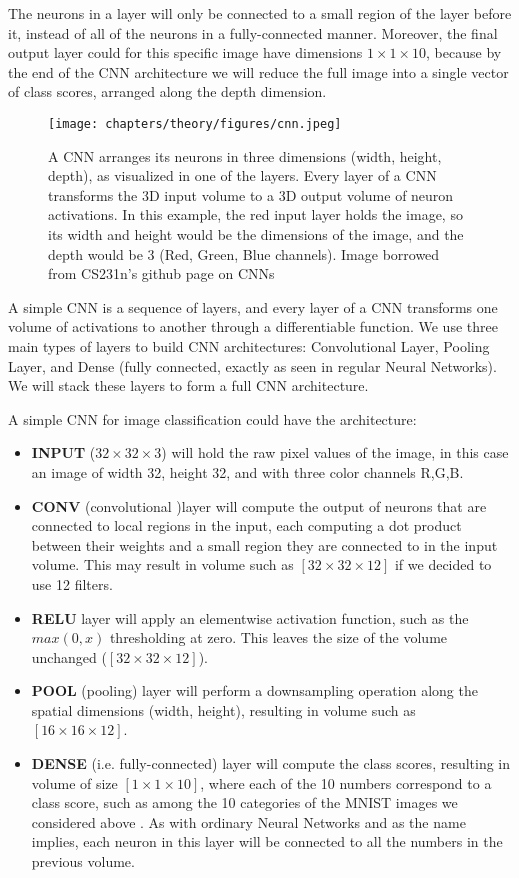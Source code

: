 The neurons in a layer will only be connected to a small region of the layer before 
it, instead of all of the neurons in a fully-connected manner. Moreover, the final
output layer could  for this specific image have dimensions $1\times 1 \times 10$, 
because by the end of the CNN architecture we will reduce the full image into a
single vector of class scores, arranged along the depth dimension. 
\begin{figure}
	\texttt{[image: chapters/theory/figures/cnn.jpeg]}
	\caption{\label{fig:cnn-example}A CNN arranges its neurons in three dimensions (width, height, depth), 
	as visualized in one of the layers. Every layer of a CNN transforms 
	the 3D input volume to a 3D output volume of neuron activations. 
	In this example, the red input layer holds the image, so its width 
	and height would be the dimensions of the image, and the depth would be 3 
	(Red, Green, Blue channels). Image borrowed from CS231n's github page \cite{cs231n}
	on CNNs}
\end{figure}

\noindent A simple CNN is a sequence of layers, and every layer of a CNN transforms one volume
of activations to another through a differentiable function. We use three main types 
of layers to build CNN architectures: Convolutional Layer, Pooling Layer, and
Dense (fully connected, exactly as seen in regular Neural Networks). We will stack 
these layers to form a full CNN architecture.

\noindent A simple CNN for image classification could have the architecture:
\begin{itemize}
	\item \textbf{INPUT} ($32\times 32 \times 3$) will hold the raw pixel values of
	the image, in this case an image of width 32, height 32, and with three color 
	channels R,G,B.
	\item \textbf{CONV} (convolutional )layer will compute the output of neurons 
	that are connected to local regions in the input, each computing a dot product 
	between their weights and a small region they are connected to in the input 
	volume. This may result in volume such as $[32\times 32\times 12]$ if we decided 
	to use 12 filters.
	\item \textbf{RELU} layer will apply an elementwise activation function,
	such as the $max(0,x)$ thresholding at zero. This leaves the size of the volume 
	unchanged ($[32\times 32\times 12]$).
	\item \textbf{POOL} (pooling) layer will perform a downsampling operation along
	the spatial dimensions (width, height), resulting in volume such as 
	$[16\times 16\times 12]$.
	\item \textbf{DENSE} (i.e. fully-connected) layer will compute the class scores,
	resulting in volume of size $[1\times 1\times 10]$, where each of the 10 numbers 
	correspond to a class score, such as among the 10 categories of the MNIST images 
	we considered above . As with ordinary Neural Networks and as the name implies,
	each neuron in this layer will be connected to all the numbers in the previous
	volume.
\end{itemize}


